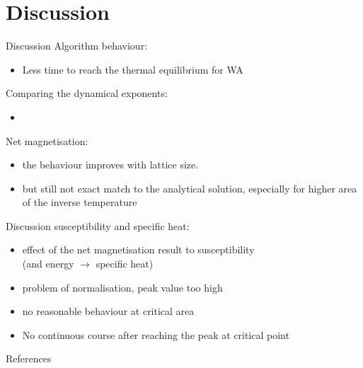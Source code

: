 \documentclass{beamer}
\begin{document}
\section{Discussion}
\begin{frame}{Discussion}
    Algorithm behaviour:
    \begin{itemize}
        \item Less time to reach the thermal equilibrium for WA
    \end{itemize}
    Comparing the dynamical exponents:
    \begin{itemize}
        \item 
    \end{itemize}
    Net magnetisation:
    \begin{itemize}
        \item the behaviour improves with lattice size.
        \item but still not exact match to the analytical solution, especially for higher area of the inverse temperature
    \end{itemize}
\end{frame}
\begin{frame}{Discussion}
    susceptibility and specific heat:
    \begin{itemize}
        \item effect of the net magnetisation result to susceptibility \\
        (and energy $\longrightarrow$ specific heat)
        \item problem of normalisation, peak value too high
        \item no reasonable behaviour at critical area
        \item No continuous course after reaching the peak at critical point 
    \end{itemize}
\end{frame}

\begin{frame}[allowframebreaks]{References}
    \nocite{*}
    \printbibliography
\end{frame}
\end{document}
